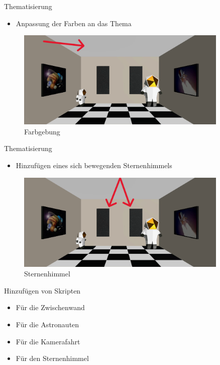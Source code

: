 \documentclass{beamer}
\begin{document}
\begin{frame}{Thematisierung}
\begin{itemize}
\item Anpassung der Farben an das Thema
\end{itemize}
\begin{figure}
    \centering
\includegraphics[width=0.9\textwidth, keepaspectratio]{thema3}
\caption{Farbgebung}
\end{figure}
\end{frame}

\begin{frame}{Thematisierung}
\begin{itemize}
\item Hinzufügen eines sich bewegenden Sternenhimmels
\end{itemize}
\begin{figure}
    \centering
\includegraphics[width=0.9\textwidth, keepaspectratio]{thema4}
\caption{Sternenhimmel \cite{nightsky}}
\end{figure}
\end{frame}

\begin{frame}{Hinzufügen von Skripten}
\begin{itemize}
\item Für die Zwischenwand
\item Für die Astronauten
\item Für die Kamerafahrt
\item Für den Sternenhimmel
\end{itemize}
\end{frame}
\end{document}
